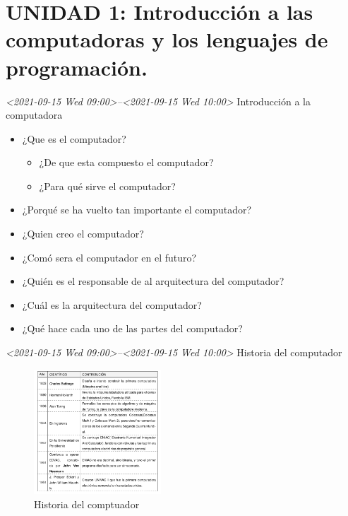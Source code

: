 \documentclass[presentation, aspectratio=54]{beamer}
\begin{document}
\section{UNIDAD 1: Introducción a las computadoras y los lenguajes de programación.}
\label{sec:org6a06622}
\begin{frame}[label={sec:org6ecb591}]{\textit{<2021-09-15 Wed 09:00>--<2021-09-15 Wed 10:00> } Introducción a la computadora}
\begin{itemize}
\item ¿Que es el computador?
\begin{itemize}
\item ¿De que esta compuesto el computador?
\item ¿Para qué sirve el computador?
\end{itemize}
\item ¿Porqué se ha vuelto tan importante el computador?
\item ¿Quien creo el computador?
\item ¿Comó sera el computador en el futuro?
\item ¿Quién es el responsable de al arquitectura del computador?
\item ¿Cuál es la arquitectura del computador?
\item ¿Qué hace cada uno de las partes del computador?
\end{itemize}
\end{frame}

\begin{frame}[label={sec:org7ac402f}]{\textit{<2021-09-15 Wed 09:00>--<2021-09-15 Wed 10:00> } Historia del computador}
\begin{figure}[htbp]
\centering
\includegraphics[width=180px]{./images/historia1.png}
\caption{Historia del comptuador}
\end{figure}
\end{frame}
\end{document}
